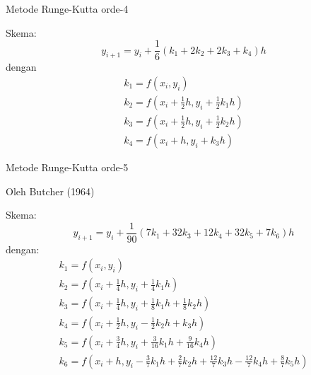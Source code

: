 Metode Runge-Kutta orde-4

Skema:
\begin{equation*}
y_{i+1} = y_{i} + \frac{1}{6}(k_1 + 2k_2 + 2k_3 + k_4) h
\end{equation*}
dengan
\begin{align*}
k_1 = f(x_i, y_i) \\
k_2 = f\left( x_i + \frac{1}{2}h, y_i + \frac{1}{2} k_1 h \right) \\
k_3 = f\left( x_i + \frac{1}{2}h, y_i + \frac{1}{2} k_2 h \right) \\
k_4 = f(x_i + h, y_i + k_3 h)
\end{align*}

Metode Runge-Kutta orde-5

Oleh Butcher (1964)

Skema:
\begin{equation*}
y_{i+1} = y_i + \frac{1}{90} ( 7 k_1 + 32 k_3 + 12 k_4 + 32 k_5 + 7 k_6) h
\end{equation*}
dengan:
\begin{align*}
k_1 = f(x_i, y_i) \\
k_2 = f\left( x_i + \frac{1}{4}h, y_i + \frac{1}{4} k_1 h \right) \\
k_3 = f\left( x_i + \frac{1}{4}h, y_i + \frac{1}{8} k_1 h + \frac{1}{8} k_2 h \right) \\
k_4 = f\left( x_i + \frac{1}{2}h, y_i - \frac{1}{2} k_2 h + k_3 h \right) \\
k_5 = f\left( x_i + \frac{3}{4}h, y_i + \frac{3}{16} k_1 h + \frac{9}{16} k_4 h \right) \\
k_6 = f\left( x_i + h, y_i - \frac{3}{7} k_1 h + \frac{2}{7} k_2 h +
\frac{12}{7}k_3 h - \frac{12}{7}k_4 h + \frac{8}{7}k_5 h \right)
\end{align*}
